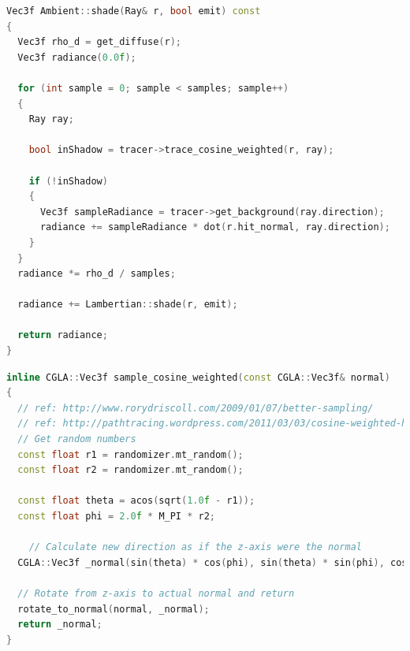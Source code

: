  \newpage
 \begin{lstlisting}[language=C++,caption=Ambient::shade,label=lst:ambient::shade,firstnumber=12]
 Vec3f Ambient::shade(Ray& r, bool emit) const
{ 
  Vec3f rho_d = get_diffuse(r);
  Vec3f radiance(0.0f);

  for (int sample = 0; sample < samples; sample++)
  {
    Ray ray;

    bool inShadow = tracer->trace_cosine_weighted(r, ray);

    if (!inShadow)
    {
      Vec3f sampleRadiance = tracer->get_background(ray.direction);
      radiance += sampleRadiance * dot(r.hit_normal, ray.direction);
    }
  }
  radiance *= rho_d / samples;

  radiance += Lambertian::shade(r, emit);

  return radiance;
}
 \end{lstlisting}
 
 \begin{lstlisting}[language=C++,caption=sampler.h sample\_cosine\_weighted,label=lst:samplecosineweighted]
 inline CGLA::Vec3f sample_cosine_weighted(const CGLA::Vec3f& normal)
{
  // ref: http://www.rorydriscoll.com/2009/01/07/better-sampling/
  // ref: http://pathtracing.wordpress.com/2011/03/03/cosine-weighted-hemisphere/
  // Get random numbers
  const float r1 = randomizer.mt_random();
  const float r2 = randomizer.mt_random();

  const float theta = acos(sqrt(1.0f - r1));
  const float phi = 2.0f * M_PI * r2;

	// Calculate new direction as if the z-axis were the normal
  CGLA::Vec3f _normal(sin(theta) * cos(phi), sin(theta) * sin(phi), cos(theta));

  // Rotate from z-axis to actual normal and return
  rotate_to_normal(normal, _normal);
  return _normal;
}
\end{lstlisting}